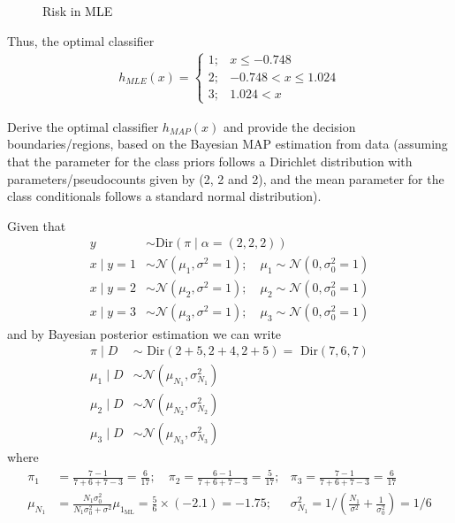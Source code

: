 \documentclass[solution,addpoints,12pt]{exam}
\begin{document}
\begin{questions}
\begin{parts}
\begin{subparts}
\begin{solution}
\begin{figure}[H]
{		}
		\caption{Risk in MLE}
		\label{fig:Risk_MLE}
	\end{figure}
	Thus, the optimal classifier 
	\begin{align*}
		h_{MLE} (x) = \left\{ \begin{array}{ll}
			1;& x\leq-0.748\\
			2;& -0.748<x\leq1.024\\
			3;& 1.024<x
			\end{array}
			\right.
	\end{align*}
\end{solution}

\subpart[4] Derive the optimal classifier $h_{MAP}(x)$ and provide the decision boundaries/regions, based on the Bayesian MAP estimation from data (assuming that the parameter for the class priors follows a Dirichlet distribution with parameters/pseudocounts given by (2, 2 and 2), and the mean parameter for the class conditionals follows a standard normal distribution).
\begin{solution}
	Given that 
	\begin{align*}
		y &\sim \text{Dir}\left(\pi\mid\alpha=(2,2,2)\right)\\
		x\mid y=1 &\sim \mathcal{N}(\mu_1,\sigma^2=1);\quad \mu_1\sim\mathcal{N}(0,\sigma_{0}^2=1)\\
		x\mid y=2 &\sim \mathcal{N}(\mu_2,\sigma^2=1);\quad \mu_2\sim\mathcal{N}(0,\sigma_{0}^2=1)\\
		x\mid y=3 &\sim \mathcal{N}(\mu_3,\sigma^2=1);\quad \mu_3\sim\mathcal{N}(0,\sigma_{0}^2=1)
	\end{align*}
	and by Bayesian posterior estimation we can write 
	\begin{align*}
		\pi\mid D&\sim\text{ Dir}(2+5,2+4,2+5)=\text{ Dir}(7,6,7)\\
		\mu_1\mid D&\sim \mathcal{N}(\mu_{N_1},\sigma_{N_1}^2)\\
		\mu_2\mid D&\sim \mathcal{N}(\mu_{N_2},\sigma_{N_2}^2)\\
		\mu_3\mid D&\sim \mathcal{N}(\mu_{N_3},\sigma_{N_3}^2)
	\end{align*}
	where
	\begin{align*}
		\pi_1& = \frac{7-1}{7+6+7-3}=\frac{6}{17};\quad\pi_2= \frac{6-1}{7+6+7-3}=\frac{5}{17}; &\pi_3=\frac{7-1}{7+6+7-3}=\frac{6}{17}\\
		\mu_{N_1}&=\frac{N_1\sigma_{0}^2}{N_1\sigma_{0}^2+\sigma^2}\mu_{1_{\text{ML}}}=\frac{5}{6}\times (-2.1)=-1.75;& \sigma_{N_1}^2 = 1/\left(\frac{N_1}{\sigma^2}+\frac{1}{\sigma_{0}^2}\right)=1/6\\

\end{align*}
\end{solution}
\end{subparts}
\end{parts}
\end{questions}
\end{document}

